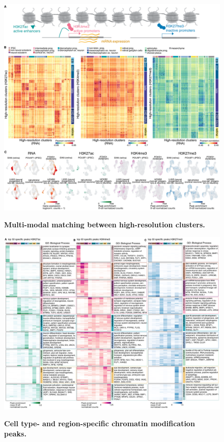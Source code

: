 \begin{figure}[h!]
    \centering
	\includegraphics[width=\textwidth]{figures/cnt/Figure_S2}
    \label{fig:regS2}
    \caption{\textbf{Multi-modal matching between high-resolution clusters.}}
\end{figure}


\begin{figure}[h!]
    \centering
	\includegraphics[width=\textwidth]{figures/cnt/Figure_S3}
    \label{fig:regS3}
    \caption{\textbf{Cell type- and region-specific chromatin modification peaks.}}
\end{figure}

